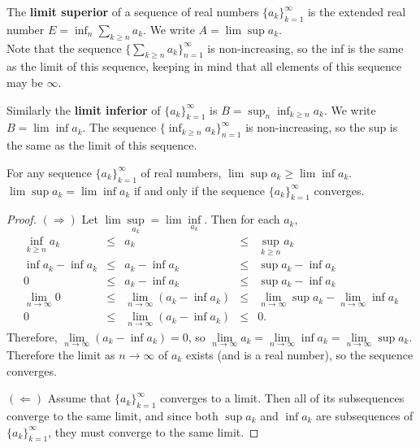 \begin{defn}\label{d:limsup}%
	The \textbf{limit superior} of a sequence of real numbers 
	$\{a_k\}_{k=1}^\infty$ is the extended real number 
	$E = \inf_n \sum_{k\ge n} a_k$. We write $A = \lim\sup a_k$. \\
	Note that the sequence $\{\sum_{k\ge n}a_k\}_{n=1}^\infty$ is 
	non-increasing, so the inf is the same as the limit of this sequence, 
	keeping in mind that all elements of this sequence may be $\infty$. 

	Similarly the \textbf{limit inferior} of $\{a_k\}_{k=1}^\infty$ is 
	$B = \sup_n\inf_{k\ge n}a_k$. We write $B = \lim\inf a_k$. The sequence 
	$\{\inf_{k\ge n}a_k\}_{n=1}^\infty$ is non-increasing, so the sup is the 
	same as the limit of this sequence. 
\end{defn}

\begin{pblm}%
	For any sequence $\{a_k\}_{k=1}^\infty$ of real numbers, $\lim\sup a_k 
	\ge \lim\inf a_k$. $\lim\sup a_k = \lim\inf a_k$ if and only if the 
	sequence $\{a_k\}_{k=1}^\infty$ converges. 
\begin{proof}
	$(\Rightarrow)$ Let $\lim\sup\limits_{a_k} = \lim\inf\limits_{a_k}$. Then 
	for each $a_k$, 
	\begin{equation*}
	\begin{array}{rcccl}
		\inf\limits_{k\ge n}a_k & \le & a_k & \le & \sup\limits_{k\ge n} a_k \\
		\inf a_k - \inf a_k & \le & a_k - \inf a_k & \le & \sup a_k - \inf a_k\\
		0 & \le & a_k - \inf a_k & \le & \sup a_k - \inf a_k\\
		\lim\limits_{n\to\infty}0 & \le & \lim\limits_{n\to\infty}(a_k - \inf a_k ) 
		& \le & \lim\limits_{n\to\infty} \sup a_k - \lim\limits_{n\to\infty}\inf a_k\\
		0 & \le & \lim\limits_{n\to\infty}(a_k - \inf a_k) & \le & 0. 
	\end{array}
	\end{equation*}
	Therefore, $\lim\limits_{n\to\infty}(a_k - \inf a_k) = 0$, so 
	$\lim\limits_{n\to\infty}a_k = \lim\limits_{n\to\infty}\inf a_k = 
	\lim\limits_{n\to\infty} \sup a_k$. Therefore the limit  as $n\to\infty$ of $a_k$ 
	exists (and is a real number), so the sequence converges. 

	\noindent$(\Leftarrow)$ Assume that $\{a_k\}_{k=1}^\infty$ converges to a limit. 
	Then all of its subsequences converge to the same limit, and since both $\sup a_k$ 
	and $\inf a_k$ are subsequences of $\{a_k\}_{k=1}^\infty$, they must converge to 
	the same limit. 
\end{proof}
\end{pblm}

